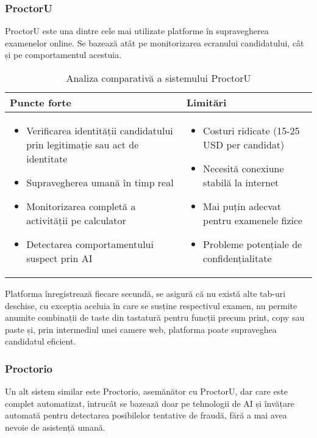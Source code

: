 \documentclass[12pt,a4paper]{article}
\begin{document}
\subsubsection{ProctorU}
ProctorU este una dintre cele mai utilizate platforme în
supravegherea examenelor online. Se bazează atât pe monitorizarea
ecranului candidatului, cât și pe comportamentul acestuia. 

\begin{table}[h]
\centering
\begin{tabular}{|p{7.5cm}|p{7.5cm}|}
\hline
\textbf{Puncte forte} & \textbf{Limitări} \\
\hline
\begin{itemize}
    \item Verificarea identității candidatului prin legitimație sau act de identitate
    \item Supravegherea umană în timp real
    \item Monitorizarea completă a activității pe calculator
    \item Detectarea comportamentului suspect prin AI
\end{itemize} & 
\begin{itemize}
    \item Costuri ridicate (15-25 USD per candidat)
    \item Necesită conexiune stabilă la internet
    \item Mai puțin adecvat pentru examenele fizice
    \item Probleme potențiale de confidențialitate
\end{itemize} \\
\hline
\end{tabular}
\caption{Analiza comparativă a sistemului ProctorU}
\end{table}

Platforma înregistrează fiecare secundă, se asigură că nu există alte tab-uri
deschise, cu excepția aceluia în care se susține respectivul examen,
nu permite anumite combinații de taste din tastatură pentru funcții precum 
print, copy sau paste și, prin intermediul unei camere web, platforma poate 
supraveghea candidatul eficient.

\subsubsection{Proctorio}
Un alt sistem similar este Proctorio, asemănător cu
ProctorU, dar care este complet automatizat, întrucât se bazează doar
pe tehnologii de AI și învățare automată pentru detectarea posibilelor
tentative de fraudă, fără a mai avea nevoie de asistență umană.
\end{document}
